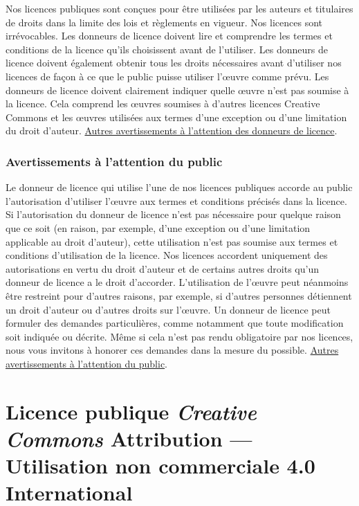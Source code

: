 Nos licences publiques sont conçues pour être utilisées par les auteurs et titulaires de droits dans la limite des lois et règlements en vigueur. Nos licences sont irrévocables. Les donneurs de licence doivent lire et comprendre les termes et conditions de la licence qu'ils choisissent avant de l’utiliser. Les donneurs de licence doivent également obtenir tous les droits nécessaires avant d'utiliser nos licences de façon à ce que le public puisse utiliser l’œuvre comme prévu. Les donneurs de licence doivent clairement indiquer quelle œuvre n'est pas soumise à la licence. Cela comprend les œuvres soumises à d’autres licences Creative Commons et les œuvres utilisées aux termes d'une exception ou d'une limitation du droit d'auteur. \href{https://wiki.creativecommons.org/wiki/Considerations_for_licensors_and_licensees#Considerations_for_licensors}{Autres avertissements à l’attention des donneurs de licence}.

\subsubsection*{Avertissements à l’attention du public}

Le donneur de licence qui utilise l'une de nos licences publiques accorde au public l’autorisation d’utiliser l’œuvre aux termes et conditions précisés dans la licence. Si l’autorisation du donneur de licence n'est pas nécessaire pour quelque raison que ce soit (en raison, par exemple, d’une exception ou d’une limitation applicable au droit d'auteur), cette utilisation n'est pas soumise aux termes et conditions d’utilisation de la licence. Nos licences accordent uniquement des autorisations en vertu du droit d'auteur et de certains autres droits qu'un donneur de licence a le droit d’accorder. L’utilisation de l’œuvre peut néanmoins être restreint pour d'autres raisons, par exemple, si d'autres personnes détiennent un droit d'auteur ou d'autres droits sur l’œuvre. Un donneur de licence peut formuler des demandes particulières, comme notamment que toute modification soit indiquée ou décrite. Même si cela n'est pas rendu obligatoire par nos licences, nous vous invitons à honorer ces demandes dans la mesure du possible. \href{https://wiki.creativecommons.org/wiki/Considerations_for_licensors_and_licensees#Considerations_for_licensees}{Autres avertissements à l’attention du public}.


\section*{Licence publique \textit{Creative Commons} Attribution --- Utilisation non commerciale 4.0 International}

